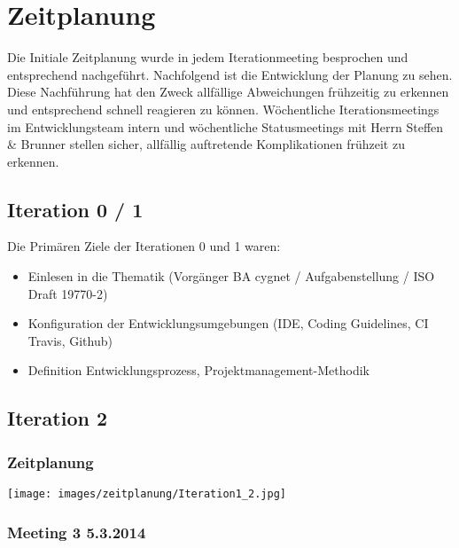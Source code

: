 \chapter{Zeitplanung}
Die Initiale Zeitplanung wurde in jedem Iterationmeeting besprochen und entsprechend nachgeführt. Nachfolgend ist die Entwicklung der Planung zu sehen. Diese Nachführung hat den Zweck allfällige Abweichungen frühzeitig zu erkennen und entsprechend schnell reagieren zu können. Wöchentliche Iterationsmeetings im Entwicklungsteam intern und wöchentliche Statusmeetings mit Herrn Steffen \& Brunner stellen sicher, allfällig auftretende Komplikationen frühzeit zu erkennen.


\section{Iteration 0 / 1}
Die Primären Ziele der Iterationen 0 und 1 waren:
\begin{itemize}
\item Einlesen in die Thematik (Vorgänger BA cygnet / Aufgabenstellung / ISO Draft 19770-2)
\item Konfiguration der Entwicklungsumgebungen (IDE, Coding Guidelines, CI Travis, Github)
\item Definition Entwicklungsprozess, Projektmanagement-Methodik
\end{itemize}

\section{Iteration 2}
\subsection{Zeitplanung}
\texttt{[image: images/zeitplanung/Iteration1\_2.jpg]}
\subsection{Meeting 3 5.3.2014}
